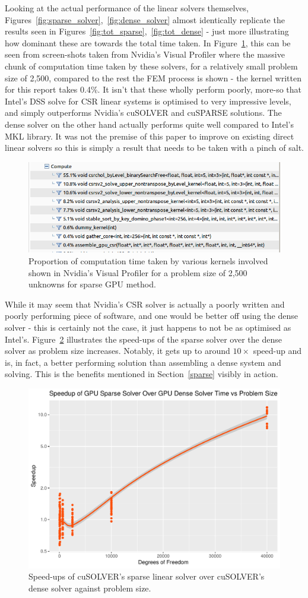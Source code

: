 Looking at the actual performance of the linear solvers themselves, Figures~\ref{fig:sparse_solver},~\ref{fig:dense_solver} almost identically replicate the results seen in Figures~\ref{fig:tot_sparse},~\ref{fig:tot_dense} - just more illustrating how dominant these are towards the total time taken. In Figure~\ref{fig:sparse_prop}, this can be seen from screen-shots taken from Nvidia's Visual Profiler where the massive chunk of computation time taken by these solvers, for a relatively small problem size of 2,500, compared to the rest the FEM process is shown - the kernel written for this report takes 0.4\%. It isn't that these wholly perform poorly, more-so that Intel's DSS solve for CSR linear systems is optimised to very impressive levels, and simply outperforms Nvidia's cuSOLVER and cuSPARSE solutions. The dense solver on the other hand actually performs quite well compared to Intel's MKL library. It was not the premise of this paper to improve on existing direct linear solvers so this is simply a result that needs to be taken with a pinch of salt.

\begin{figure}
	\centering
	\includegraphics[width = 0.7\linewidth]{Figures/sparse_prop_50}
	\caption{Proportion of computation time taken by various kernels involved shown in Nvidia's Visual Profiler for a problem size of 2,500 unknowns for sparse GPU method.}
	\label{fig:sparse_prop}
\end{figure}

While it may seem that Nvidia's CSR solver is actually a poorly written and poorly performing piece of software, and one would be better off using the dense solver - this is certainly not the case, it just happens to not be as optimised as Intel's. Figure~\ref{fig:gpu_solve} illustrates the speed-ups of the sparse solver over the dense solver as problem size increases. Notably, it gets up to around $10\times$ speed-up and is, in fact, a better performing solution than assembling a dense system and solving. This is the benefits mentioned in Section~\ref{sparse} visibly in action.

\begin{figure}
	\centering
	\includegraphics[width = 0.48\linewidth]{Plots/solve_gpus_speedup_vs_n}
	\caption{Speed-ups of cuSOLVER's sparse linear solver over cuSOLVER's dense solver against problem size.}
	\label{fig:gpu_solve}
\end{figure}

